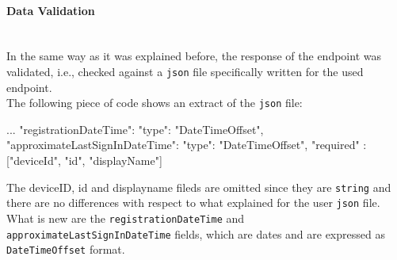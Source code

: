 \documentclass[12pt, a4paper, oneside]{article}
\begin{document}
\paragraph{Data Validation} ~\\
In the same way as it was explained before, the response of the endpoint was validated, i.e., checked against a \texttt{json} file specifically written for the used endpoint.\\
The following piece of code shows an extract of the \texttt{json} file:
\begin{python}
{
...
"registrationDateTime": {"type": "DateTimeOffset"},
"approximateLastSignInDateTime": {"type": "DateTimeOffset"},
"required" : ["deviceId", "id", "displayName"]
}
\end{python}
The deviceID, id and displayname fileds are omitted since they are \texttt{string} and there are no differences with respect to what explained for the user \texttt{json} file.
What is new are the \texttt{registrationDateTime} and \\ \texttt{approximateLastSignInDateTime} fields, which are dates and are expressed as \texttt{DateTimeOffset} format.
\end{document}

